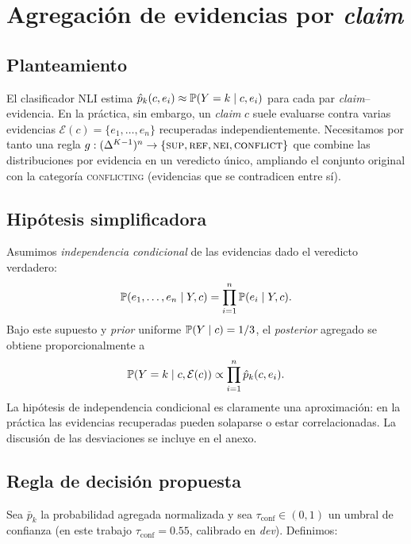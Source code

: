 \chapter{Agregación de evidencias por \emph{claim}}\label{cap:agregacion}

\section{Planteamiento}

El clasificador NLI estima
$\hat{p}_k(c, e_i) \approx \mathbb{P}(Y = k \mid c, e_i)$ para cada par
\emph{claim}--evidencia. En la práctica, sin embargo, un \emph{claim} $c$
suele evaluarse contra varias evidencias
$\mathcal{E}(c) = \{e_1, \dots, e_n\}$ recuperadas independientemente.
Necesitamos por tanto una regla
$g : (\Delta^{K-1})^n \to \{\textsc{sup}, \textsc{ref}, \textsc{nei},
\textsc{conflict}\}$ que combine las distribuciones por evidencia en un
veredicto único, ampliando el conjunto original con la categoría
\textsc{conflicting} (evidencias que se contradicen entre sí).

\section{Hipótesis simplificadora}

Asumimos \emph{independencia condicional} de las evidencias dado el
veredicto verdadero:
\[
  \mathbb{P}(e_1, \dots, e_n \mid Y, c)
  = \prod_{i=1}^n \mathbb{P}(e_i \mid Y, c).
\]
Bajo este supuesto y \emph{prior} uniforme $\mathbb{P}(Y \mid c) = 1/3$, el
\emph{posterior} agregado se obtiene proporcionalmente a
\[
  \mathbb{P}(Y = k \mid c, \mathcal{E}(c))
  \propto \prod_{i=1}^n \hat{p}_k(c, e_i).
\]
La hipótesis de independencia condicional es claramente una
aproximación: en la práctica las evidencias recuperadas pueden
solaparse o estar correlacionadas. La discusión de las desviaciones se
incluye en el anexo.

\section{Regla de decisión propuesta}

Sea $\bar{p}_k$ la probabilidad agregada normalizada y sea
$\tau_{\text{conf}} \in (0, 1)$ un umbral de confianza (en este trabajo
$\tau_{\text{conf}} = 0.55$, calibrado en \emph{dev}). Definimos:

